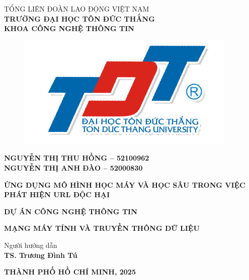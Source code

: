 \documentclass[13pt]{article}
\begin{document}
\newpage
	\fontsize{14pt}{20pt}\selectfont
	\begin{center}
		TỔNG LIÊN ĐOÀN LAO ĐỘNG VIỆT NAM \\\textbf{TRƯỜNG ĐẠI HỌC TÔN ĐỨC THẮNG}\\
        \textbf{KHOA CÔNG NGHỆ THÔNG TIN}\\
	\end{center}
	\vspace{1cm}
	\begin{figure}[h]
		\centering
		\includegraphics[width=0.3\linewidth]{image/Logo.png}
	\end{figure}
	\vspace{-1cm}
	\vspace{1cm}
	\fontsize{14pt}{20pt}\selectfont
	\begin{center}
		\textbf{NGUYỄN THỊ THU HỒNG – 52100962}\\
        \textbf{NGUYỄN THỊ ANH ĐÀO – 52000830}
	\end{center}
	\vspace{0.5cm}
	\fontsize{22pt}{20pt}\selectfont
	\begin{center}\Huge
		\textbf{ỨNG DỤNG MÔ HÌNH HỌC MÁY VÀ HỌC SÂU TRONG VIỆC PHÁT HIỆN URL ĐỘC HẠI}	
	\end{center}
    \vspace{0.5cm}
	\fontsize{20pt}{20pt}\selectfont
	\begin{center}
        \textbf{DỰ ÁN CÔNG NGHỆ THÔNG TIN}
	\end{center}\Large
    \vspace{0.5cm}
	\fontsize{20pt}{20pt}\selectfont
	\begin{center}
        \textbf{MẠNG MÁY TÍNH 
        VÀ TRUYỀN THÔNG DỮ LIỆU}
	\end{center}\Large
    \vspace{0.5cm}
	\fontsize{14pt}{20pt}\selectfont
	\begin{center}
		Người hướng dẫn\\
        \textbf{TS. Trương Đình Tú}
	\end{center}
	\vspace{0.5cm}
	\fontsize{14pt}{20pt}\selectfont
	\begin{center}
		\textbf{THÀNH PHỐ HỒ CHÍ MINH, 2025}
	\end{center}
    
\end{document}

